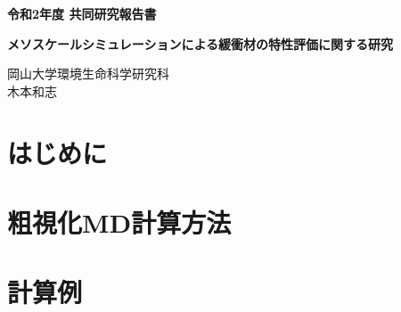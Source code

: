 ﻿\documentclass[11pt,a4j]{jarticle}
\newlength{\minitwocolumn}
\begin{document}
\newcommand{\fat}[1]{\mbox{\boldmath $#1$}}
\newcommand{\D}{\partial}
\newcommand{\w}{\omega}
\newcommand{\ga}{\alpha}
\newcommand{\gb}{\beta}
\newcommand{\gx}{\xi}
\newcommand{\gz}{\zeta}
\newcommand{\vhat}[1]{\hat{\fat{#1}}}
\newcommand{\spc}{\vspace{0.7\baselineskip}}
\newcommand{\halfspc}{\vspace{0.3\baselineskip}}

\newcommand{\twofig}[2]
 {
   \begin{figure}[h]
     \begin{minipage}[t]{\minitwocolumn}
         \begin{center}   #1
         \end{center}
     \end{minipage}
         \hspace{\columnsep}
     \begin{minipage}[t]{\minitwocolumn}
         \begin{center} #2
         \end{center}
     \end{minipage}
   \end{figure}
 }
\begin{center}
{\Large \bf 令和2年度 共同研究報告書}
\end{center}
\vspace{2mm}
\begin{center}
{\LARGE \bf 
メソスケールシミュレーションによる緩衝材の特性評価に関する研究} 
\end{center}
\begin{center}
岡山大学環境生命科学研究科\\
木本和志
\end{center}
\vspace{10mm}
\section{はじめに}

\section{粗視化MD計算方法}

\section{計算例}
%
\end{document}
